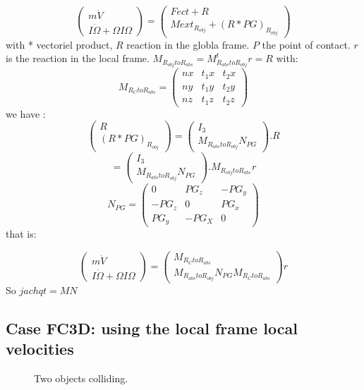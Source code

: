 \[\left(\begin{array}{c}m \dot V\\I \dot \Omega + \Omega I \Omega \end{array}\right)= \left(\begin{array}{c}Fect+R\\Mext _{R_{obj}} + (R*PG) _{R_{obj}} \end{array}\right)\]
  with * vectoriel product, $R$ reaction in the globla frame. $P$ the point of contact.
  $r$ is the reaction in the local frame.  $M_{R_{obj}toR_{abs}}=M_{R_{abs}toR_{obj}}^t r=R$ with:
  \[M_{R_{C}toR_{abs}}=\left(\begin{array}{ccc} nx&t_1x&t_2x \\ny&t_1y&t_2y\\nz&t_1z&t_2z \end{array}\right)\]
  we have :
  \[\left(\begin{array}{c}R\\(R*PG) _{R_{obj}}\end{array}\right)=\left(\begin{array}{c} I_3\\M_{R_{abs}toR_{obj}}N_{PG}\end{array}\right).R\]
  \[=\left(\begin{array}{c} I_3\\M_{R_{abs}toR_{obj}}N_{PG}\end{array}\right).M_{R_{obj}toR_{abs}}r\]
  \[ N_{PG}=\left(\begin{array}{ccc} 0&PG_z&-PG_y\\-PG_z&0&PG_x\\PG_y&-PG_X&0\end{array}\right)\]
    that is:

\[\left(\begin{array}{c}m \dot V\\I \dot \Omega + \Omega I \Omega \end{array}\right)=
\left(\begin{array}{c} M_{R_{C}toR_{abs}} \\
  M_{R_{abs}toR_{obj}}N_{PG}M_{R_{C}toR_{abs}}
\end{array}\right) r\]
So $jachqt=MN$

\subsection{Case FC3D: using the local frame local velocities}
\begin{figure}[h!]
  \centering
   \scalebox{0.6}{
  
  }
  \caption{Two objects colliding.}
  \label{figCase}
\end{figure}


